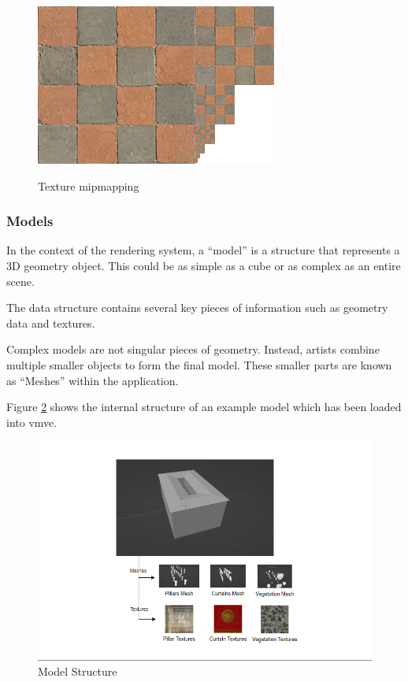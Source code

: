 \documentclass[11pt]{article}
\begin{document}
\begin{figure}[h!]
  \centering
  \includegraphics[width=\textwidth]{images/mipmaps.png}
  \caption{Texture mipmapping}
  \label{fig:texture_mipmapping} \cite{texture_mipmaps}
\end{figure}


\subsubsection{Models}
In the context of the rendering system, a ``model'' is a structure that
represents a 3D geometry object. This could be as simple as a cube or as complex
as an entire scene.

The data structure contains several key pieces of information such as geometry
data and textures. 

Complex models are not singular pieces of geometry. Instead, artists combine
multiple smaller objects to form the final model. These smaller parts are known
as ``Meshes'' within the application.

Figure \ref{fig:model} shows the internal structure of an example model which
has been loaded into \gls{vmve}.
\begin{figure}[h!]
  \centering
  \includegraphics[width=\textwidth]{images/model.png}
  \caption{Model Structure}
  \label{fig:model}
\end{figure}
\end{document}
